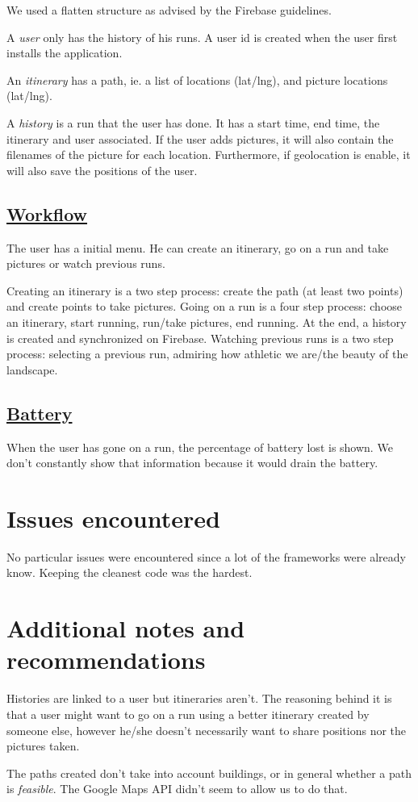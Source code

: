 \documentclass{article}
\begin{document}
We used a flatten structure as advised by the Firebase guidelines. 

A \textit{user} only has the history of his runs. A user id is created when the user first installs the application. 

An \textit{itinerary} has a path, ie. a list of locations (lat/lng), and picture locations (lat/lng).

A \textit{history} is a run that the user has done. It has a start time, end time, the itinerary and user associated. If the user adds pictures, it will also contain the filenames of the picture for each location. Furthermore, if geolocation is enable, it will also save the positions of the user.

\subsection{\href{https://media.giphy.com/media/ZvJ0bHvAy1N9S/giphy.gif}{Workflow}}

The user has a initial menu. He can create an itinerary, go on a run and take pictures or watch previous runs.

Creating an itinerary is a two step process: create the path (at least two points) and create points to take pictures.
Going on a run is a four step process: choose an itinerary, start running, run/take pictures, end running. At the end, a history is created and synchronized on Firebase.
Watching previous runs is a two step process: selecting a previous run, admiring how athletic we are/the beauty of the landscape.

\subsection{\href{https://youtu.be/KQ5_jumTeT4?t=11m}{Battery}}

When the user has gone on a run, the percentage of battery lost is shown. We don't constantly show that information because it would drain the battery.
\section{Issues encountered}

No particular issues were encountered since a lot of the frameworks were already know. Keeping the cleanest code was the hardest.

\section{Additional notes and recommendations}

Histories are linked to a user but itineraries aren't. The reasoning behind it is that a user might want to go on a run using a better itinerary created by someone else, however he/she doesn't necessarily want to share positions nor the pictures taken. 

The paths created don't take into account buildings, or in general whether a path is \textit{feasible}. The Google Maps API didn't seem to allow us to do that.
\end{document}
